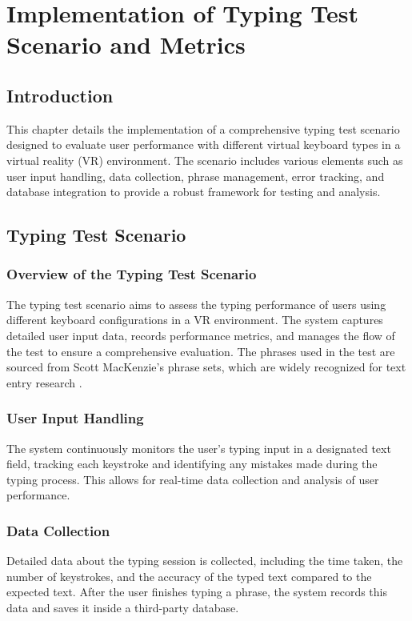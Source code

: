 \chapter{Implementation of Typing Test Scenario and Metrics}

\section{Introduction}
This chapter details the implementation of a comprehensive typing test scenario designed to evaluate user performance with different virtual keyboard types in a virtual reality (VR) environment. The scenario includes various elements such as user input handling, data collection, phrase management, error tracking, and database integration to provide a robust framework for testing and analysis.

\section{Typing Test Scenario}

\subsection{Overview of the Typing Test Scenario}
The typing test scenario aims to assess the typing performance of users using different keyboard configurations in a VR environment. The system captures detailed user input data, records performance metrics, and manages the flow of the test to ensure a comprehensive evaluation. The phrases used in the test are sourced from Scott MacKenzie's phrase sets, which are widely recognized for text entry research \cite{mackenzie_phrase_set}.

\subsection{User Input Handling}
The system continuously monitors the user's typing input in a designated text field, tracking each keystroke and identifying any mistakes made during the typing process. This allows for real-time data collection and analysis of user performance.

\subsection{Data Collection}
Detailed data about the typing session is collected, including the time taken, the number of keystrokes, and the accuracy of the typed text compared to the expected text. After the user finishes typing a phrase, the system records this data and saves it inside a third-party database.

